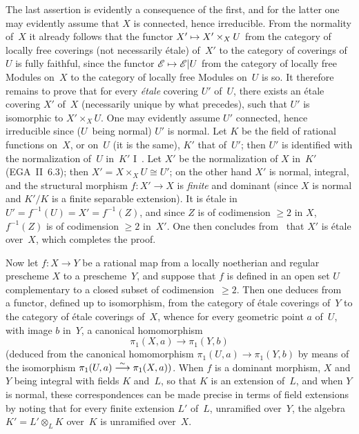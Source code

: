 The last assertion is evidently a consequence of the
first, and for the latter one may evidently assume that $X$
is connected, hence irreducible. From the normality of~$X$
it already follows that the functor $X'\mto X'\times_X U$ from
the category of locally free coverings (not
necessarily \'etale) of~$X'$ to the category of
coverings of~$U$ is fully faithful, since the functor
$\cal{E}\mto\cal{E}\vert U$ from the category of locally free
Modules on~$X$ to the category of locally
free Modules on~$U$ is so. It therefore remains to prove that for every
\emph{\'etale} covering $U'$ of~$U$, there exists an
\'etale covering $X'$ of~$X$ (necessarily unique
by what precedes), such that $U'$ is isomorphic to
$X'\times_X U$. One may evidently assume $U'$ connected, hence
irreducible since ($U$~being normal) $U'$ is normal. Let
$K$ be the field of rational functions on~$X$, or on~$U$ (it is
the same), $K'$ that of~$U'$; then $U'$ is identified with the normalization
of~$U$ in~$K'$ I~. Let $X'$ be the normalization of
$X$ in~$K'$ (EGA~II~6.3); then $X'=X\times_X U \cong U'$; on the other
hand $X'$ is normal, integral, and the structural morphism $f\colon
X'\to X$ is \emph{finite} and dominant (since $X$ is normal and $K'/K$ is
a finite separable extension). It is \'etale in
$U'=f^{-1}(U)=X'=f^{-1}(Z)$, and since $Z$ is of codimension $\ge 2$
in $X$, $f^{-1}(Z)$ is of codimension $\ge 2$ in~$X'$. One then concludes
from~ that $X'$ is \'etale over~$X$, which completes
the proof.

\medskip
Now let $f\colon X\to Y$ be a rational map from a
locally noetherian and regular prescheme $X$
to a prescheme~$Y$, and suppose that $f$ is defined
in an open set $U$ complementary to a closed subset of
codimension~$\ge 2$. Then one deduces from~ a functor,
defined up to isomorphism, from the category of
\'etale coverings of~$Y$ to the category of
\'etale coverings of~$X$, whence for every
geometric point $a$ of~$U$, with image $b$ in~$Y$, a canonical
homomorphism
$$
\pi_1(X,a)\to \pi_1(Y,b)
$$
(deduced
from the canonical homomorphism $\pi_1(U,a)\to \pi_1(Y,b)$ by means
of the isomorphism $\pi_1(U,a)\overset{\sim}{\longrightarrow} \pi_1(X,a))$. When $f$ is
a dominant morphism, $X$ and $Y$ being integral with fields $K$
and~$L$, so that $K$ is an extension of~$L$, and when $Y$ is
normal, these correspondences can be made precise in terms of field
extensions by noting that for every finite extension $L'$ of~$L$,
unramified over~$Y$, the algebra $K'=L'\otimes_L K$ over~$K$ is
unramified over~$X$.

